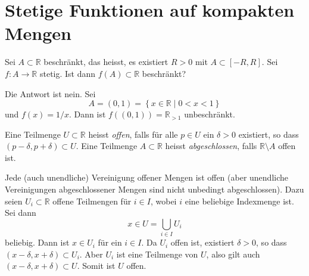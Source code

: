 \documentclass[../main.tex]{subfiles}
\begin{document}
\section{Stetige Funktionen auf kompakten Mengen}

\begin{question}
Sei $A \subset \mathbb{R}$ beschränkt,
das heisst, es existiert $R > 0$ 
mit $A \subset [-R, R]$.
Sei $f \colon A \to \mathbb{R}$ stetig.
Ist dann $f(A) \subset \mathbb{R}$ beschränkt?
\end{question}

\begin{example}
  Die Antwort ist nein. Sei 
  \[
    A = (0, 1) = \left\{x \in \mathbb{R} \mid 0 < x < 1\right\}
  \]
  und $f(x) = 1/x$. Dann ist $f((0, 1)) = \mathbb{R}_{>1}$ 
  unbeschränkt.
\end{example}

\begin{definition}
  Eine Teilmenge
  $U \subset \mathbb{R}$ 
  heisst \emph{offen},
  falls für
  alle $p \in U$ ein
  $\delta > 0$ existiert,
  so dass $(p - \delta, p + \delta)
  \subset U$.
Eine Teilmenge
  $A \subset \mathbb{R}$ 
  heisst  \emph{abgeschlossen},
  falls $\mathbb{R} \setminus A$ 
  offen ist.
\end{definition}

\begin{remark}
  Jede (auch unendliche) Vereinigung offener Mengen ist offen
  (aber unendliche Vereinigungen abgeschlossener Mengen
  sind nicht unbedingt abgeschlossen).
  Dazu seien $U_i \subset \mathbb{R}$ offene Teilmengen
  für $i \in I$, wobei $i$ eine 
  beliebige Indexmenge ist. Sei dann
  \[
    x \in U = \bigcup_{i \in I} U_i
  \]
  beliebig. Dann ist $x \in U_i$ für
  ein $i \in I$. Da $U_i$ offen ist, existiert
  $\delta > 0$, so dass $(x - \delta, x + \delta) \subset U_i$.
  Aber $U_i$ ist eine Teilmenge von $U$, also
  gilt auch $(x - \delta, x + \delta) \subset U$. Somit ist
  $U$ offen.
\end{remark}
\end{document}
